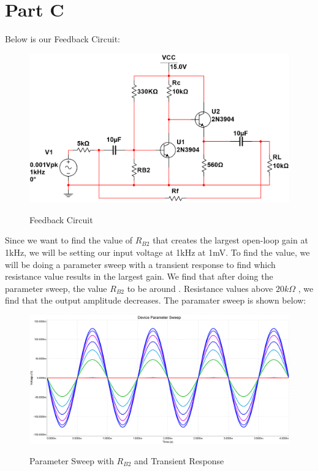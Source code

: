 \documentclass[12pt]{article}
\begin{document}
\section{Part C}
Below is our Feedback Circuit:
\begin{figure}[H]
    \centering
    \includegraphics[height=0.3\textwidth]{Images/partCcircuit.png}\\
    \caption{Feedback Circuit}
    \label{fig:feedbackcircuit}
\end{figure}

Since we want to find the value of $R_{B2}$ that creates the largest open-loop gain at 1kHz, we will be setting our
input voltage at 1kHz at 1mV. To find the value, we will be doing a parameter sweep with a transient response to 
find which resistance value results in the largest gain. We find that after doing the parameter sweep,
the value $R_{B2}$ to be around . Resistance values above $20k\Omega$
, we find that the output amplitude decreases. The paramater sweep is shown below:

\begin{figure}[h!]
    \centering
    \includegraphics[height=0.4\textwidth]{Images/parametersweep.png}\\
    \caption{Parameter Sweep with $R_{B2}$ and Transient Response}
    \label{fig:parametersweep}
\end{figure}
\end{document}

